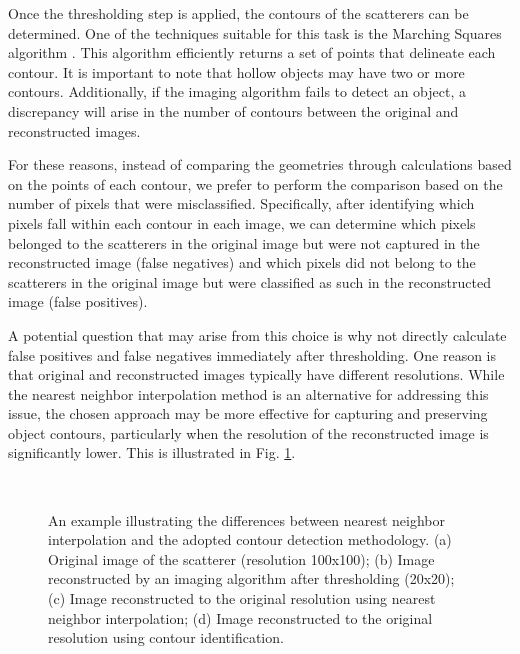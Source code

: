 \documentclass{IEEEtran}
\begin{document}
			Once the thresholding step is applied, the contours of the scatterers can be determined. One of the techniques suitable for this task is the Marching Squares algorithm \cite{lorensen1987marching}. This algorithm efficiently returns a set of points that delineate each contour. It is important to note that hollow objects may have two or more contours. Additionally, if the imaging algorithm fails to detect an object, a discrepancy will arise in the number of contours between the original and reconstructed images.
			
			For these reasons, instead of comparing the geometries through calculations based on the points of each contour, we prefer to perform the comparison based on the number of pixels that were misclassified. Specifically, after identifying which pixels fall within each contour in each image, we can determine which pixels belonged to the scatterers in the original image but were not captured in the reconstructed image (false negatives) and which pixels did not belong to the scatterers in the original image but were classified as such in the reconstructed image (false positives).
			
			A potential question that may arise from this choice is why not directly calculate false positives and false negatives immediately after thresholding. One reason is that original and reconstructed images typically have different resolutions. While the nearest neighbor interpolation method is an alternative for addressing this issue, the chosen approach may be more effective for capturing and preserving object contours, particularly when the resolution of the reconstructed image is significantly lower. This is illustrated in Fig. \ref{fig:contourmotivation}.
			
			\begin{figure}[!t]
				\centering
				 \\
				\caption{An example illustrating the differences between nearest neighbor interpolation and the adopted contour detection methodology. (a) Original image of the scatterer (resolution 100x100); (b) Image reconstructed by an imaging algorithm after thresholding (20x20); (c) Image reconstructed to the original resolution using nearest neighbor interpolation; (d) Image reconstructed to the original resolution using contour identification.}
				\label{fig:contourmotivation}
			\end{figure}
\end{document}
